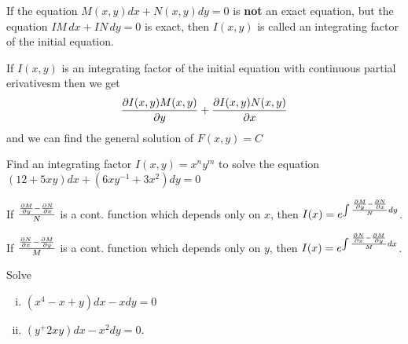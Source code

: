 

\begin{definition}
	If the equation $M(x,y)dx + N(x,y)dy = 0$ is \textbf{not} an exact equation, but the equation 
	$IM\,dx+ IN\,dy = 0$ is exact, then $I(x,y)$ is called an integrating factor of the initial
	equation.
\end{definition}

\begin{remark}
	If $I(x,y)$ is an integrating factor of the initial equation with continuous partial
	erivativesm then we get \[\frac{\partial I(x,y)M(x,y)}{\partial y} + \frac{\partial I(x,y)N(x,y)}{\partial x}\] and we can find the
	general solution of $F(x,y) = C$
\end{remark}

\begin{example}
Find an integrating factor $I(x,y) = x^ny^m$ to solve the equation
$(12+5xy)dx + (6xy^{-1} + 3x^2)dy = 0$
\end{example}

\begin{theorem}
	If $\frac{\frac{\partial M}{\partial y} - \frac{\partial N}{\partial x}}{N}$ is a cont. function which depends only on $x$, then $I(x) =
	e^{\int \frac{\frac{\partial M}{\partial y} - \frac{\partial N}{\partial x}}{N}dy}$.
\end{theorem}

\begin{theorem}
	If $\frac{\frac{\partial N}{\partial x} - \frac{\partial M}{\partial y}}{M}$ is a cont. function which depends only on $y$, then $I(x) =
	e^{\int \frac{\frac{\partial N}{\partial x} - \frac{\partial M}{\partial y}}{M}dx}$.
\end{theorem}

\begin{example}
	Solve 
	\begin{enumerate}[i)]
		\item $(x^4 - x + y)dx - x dy = 0$ 
		\item $(y^+2xy)dx -x^2 dy = 0$.
	\end{enumerate}
\end{example}
